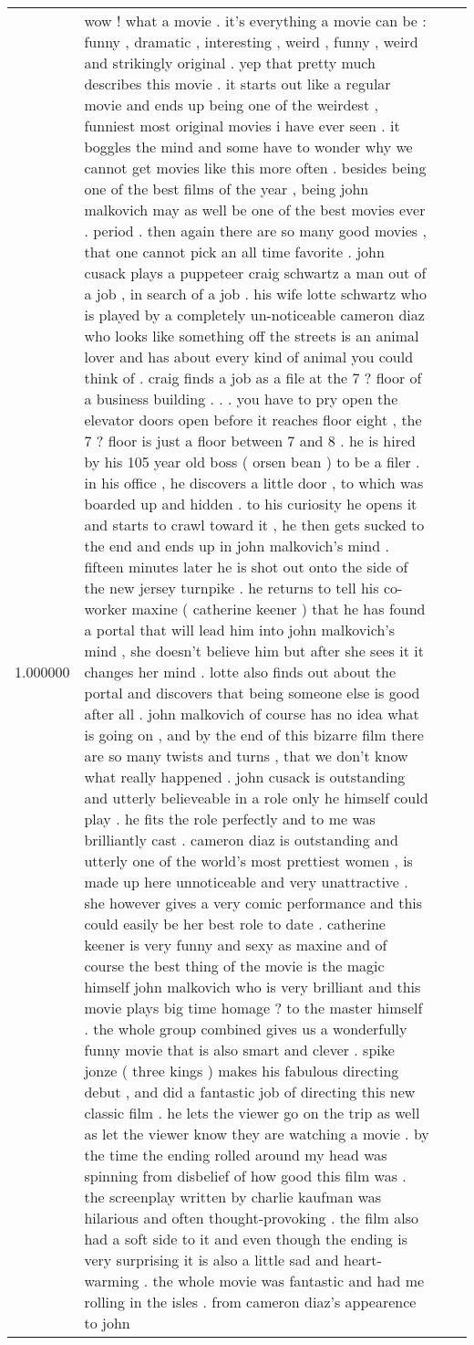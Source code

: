 \begin{tabular}{r{1cm} p{0.4in} r{1cm} p{0.4in}}
1.000000 & wow ! what a movie .  it's everything a movie can be : funny , dramatic , interesting , weird , funny , weird and strikingly original .  yep that pretty much describes this movie .  it starts out like a regular movie and ends up being one of the weirdest , funniest most original movies i have ever seen .  it boggles the mind and some have to wonder why we cannot get movies like this more often .  besides being one of the best films of the year , being john malkovich may as well be one of the best movies ever .  period .  then again there are so many good movies , that one cannot pick an all time favorite .  john cusack plays a puppeteer craig schwartz a man out of a job , in search of a job .  his wife lotte schwartz who is played by a completely un-noticeable cameron diaz who looks like something off the streets is an animal lover and has about every kind of animal you could think of .  craig finds a job as a file at the 7 ? floor of a business building . . . you  have to pry open the elevator doors open before it reaches floor eight , the 7 ? floor is just a floor between 7 and 8 .  he is hired by his 105 year old boss ( orsen bean ) to be a filer .  in his office , he discovers a little door , to which was boarded up and hidden .  to his curiosity he opens it and starts to crawl toward it , he then gets sucked to the end and ends up in john malkovich's mind .  fifteen minutes later he is shot out onto the side of the new jersey turnpike .  he returns to tell his co-worker maxine ( catherine keener ) that he has found a portal that will lead him into john malkovich's mind , she doesn't believe him but after she sees it it changes her mind .  lotte also finds out about the portal and discovers that being someone else is good after all .  john malkovich of course has no idea what is going on , and by the end of this bizarre film there are so many twists and turns , that we don't know what really happened .  john cusack is outstanding and utterly believeable in a role only he himself could play .  he fits the role perfectly and to me was brilliantly cast .  cameron diaz is outstanding and utterly one of the world's most prettiest women , is made up here unnoticeable and very unattractive .  she however gives a very comic performance and this could easily be her best role to date .  catherine keener is very funny and sexy as maxine and of course the best thing of the movie is the magic himself john malkovich who is very brilliant and this movie plays big time homage ? to the master himself .  the whole group combined gives us a wonderfully funny movie that is also smart and clever .  spike jonze ( three kings ) makes his fabulous directing debut , and did a fantastic job of directing this new classic film .  he lets the viewer go on the trip as well as let the viewer know they are watching a movie .  by the time the ending rolled around my head was spinning from disbelief of how good this film was .  the screenplay written by charlie kaufman was hilarious and often thought-provoking .  the film also had a soft side to it and even though the ending is very surprising it is also a little sad and heart-warming .  the whole movie was fantastic and had me rolling in the isles .  from cameron diaz's appearence to john 
\end{tabular}
